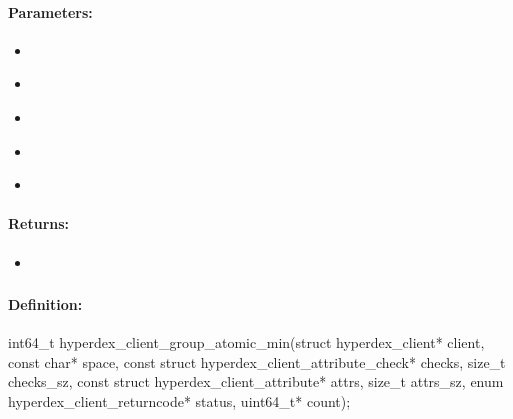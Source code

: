 \paragraph{Parameters:}
\begin{itemize}[noitemsep]
\item {}\\

\item {}\\

\item {}\\

\item {}\\

\item {}\\

\end{itemize}

\paragraph{Returns:}
\begin{itemize}[noitemsep]
\item {}\\

\end{itemize}

\pagebreak
\subsubsection{}
\label{api:c:group_atomic_min}


\paragraph{Definition:}
\begin{ccode}
int64_t hyperdex_client_group_atomic_min(struct hyperdex_client* client,
        const char* space,
        const struct hyperdex_client_attribute_check* checks, size_t checks_sz,
        const struct hyperdex_client_attribute* attrs, size_t attrs_sz,
        enum hyperdex_client_returncode* status,
        uint64_t* count);
\end{ccode}


